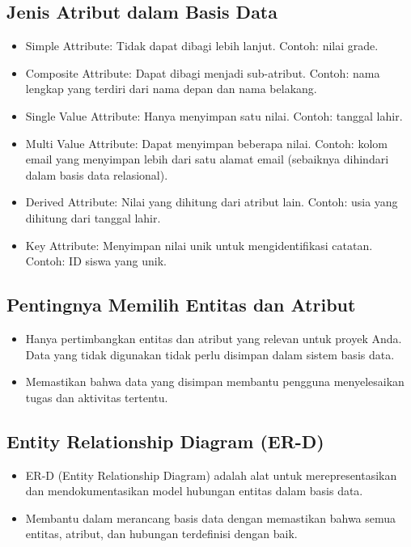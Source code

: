 \documentclass{article}
\begin{document}
\subsection{Jenis Atribut dalam Basis Data}
\begin{itemize}
    \item Simple Attribute: Tidak dapat dibagi lebih lanjut. Contoh: nilai grade.
    \item Composite Attribute: Dapat dibagi menjadi sub-atribut. Contoh: nama lengkap yang terdiri dari nama depan dan nama belakang.
    \item Single Value Attribute: Hanya menyimpan satu nilai. Contoh: tanggal lahir.
    \item Multi Value Attribute: Dapat menyimpan beberapa nilai. Contoh: kolom email yang menyimpan lebih dari satu alamat email (sebaiknya dihindari dalam basis data relasional).
    \item Derived Attribute: Nilai yang dihitung dari atribut lain. Contoh: usia yang dihitung dari tanggal lahir.
    \item Key Attribute: Menyimpan nilai unik untuk mengidentifikasi catatan. Contoh: ID siswa yang unik.
\end{itemize}

\subsection{Pentingnya Memilih Entitas dan Atribut}
\begin{itemize}
    \item Hanya pertimbangkan entitas dan atribut yang relevan untuk proyek Anda. Data yang tidak digunakan tidak perlu disimpan dalam sistem basis data.
    \item Memastikan bahwa data yang disimpan membantu pengguna menyelesaikan tugas dan aktivitas tertentu.
\end{itemize}

\subsection{Entity Relationship Diagram (ER-D)}
\begin{itemize}
    \item ER-D (Entity Relationship Diagram) adalah alat untuk merepresentasikan dan mendokumentasikan model hubungan entitas dalam basis data.
    \item Membantu dalam merancang basis data dengan memastikan bahwa semua entitas, atribut, dan hubungan terdefinisi dengan baik.
\end{itemize}
\end{document}
